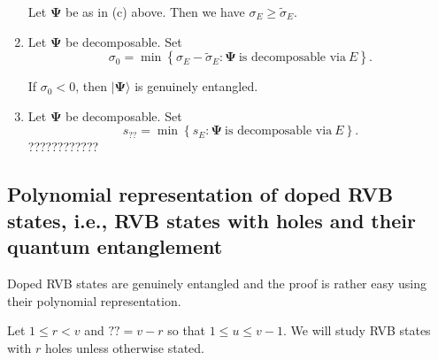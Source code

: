 \documentclass[a4paper,12pt]{article}
\theoremstyle{definition}
\theoremstyle{underlinethm}
\theoremstyle{definition}
\begin{document}
\begin{enumerate}[label=(\alph*)]
Let $\boldsymbol{\Psi}$ be as in (c) above. Then we have $\sigma_{E} \geq \widetilde{\sigma}_{E}$.

\item Let $\boldsymbol{\Psi}$ be decomposable. Set
$$
\sigma_{0} = \min \left\{\sigma_{E}- \widetilde{\sigma}_{E} : \boldsymbol{\Psi}~\text{is decomposable via}~ E\right\}.
$$

If $\sigma_{0} < 0$, then $| \boldsymbol{\Psi}\rangle$ is genuinely entangled.

\item Let $\boldsymbol{\Psi}$ be decomposable. Set
$$
s_{??} = \min \left\{s_{E} : \boldsymbol{\Psi}~ \text{is decomposable via}~E \right\}.
$$
 ????????????
\end{enumerate}

\subsection{Polynomial representation of doped RVB states, i.e., RVB states with holes and their quantum entanglement}

Doped RVB states are genuinely entangled and the proof is rather easy using their polynomial representation.

Let $1 \leq r < v$ and $??=v-r$ so that $1 \leq u \leq v-1$. We will study RVB states with $r$ holes unless otherwise stated.
\end{document}
